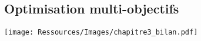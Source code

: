 \documentclass[xcolor=x11names, compress, 11pt]{beamer}
\begin{document}
\subsection{Optimisation multi-objectifs}
\begin{frame}[t]
    \vfill
    \centering
    \texttt{[image: Ressources/Images/chapitre3\_bilan.pdf]}
    \vfill
\end{frame}


\end{document}
